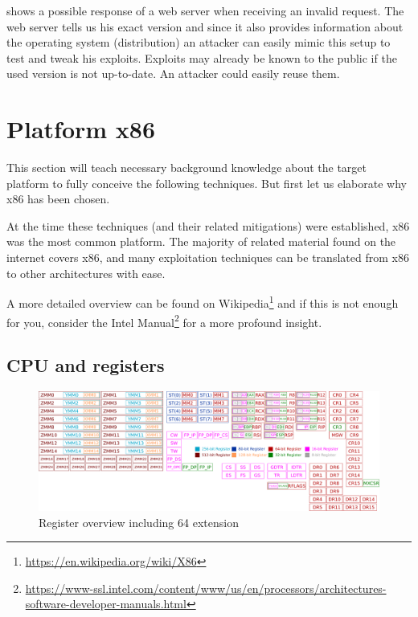\documentclass[article]{uibk}
\begin{document}
 shows a possible response of a web server when
receiving an invalid request. The web server tells us his exact version and
since it also provides information about the operating system (distribution) an
attacker can easily mimic this setup to test and tweak his exploits. Exploits
may already be known to the public if the used version is not up-to-date. An
attacker could easily reuse them.

\section{Platform x86}

This section will teach necessary background knowledge about the target
platform to fully conceive the following techniques. But first let us elaborate
why x86 has been chosen.

At the time these techniques (and their related mitigations) were established,
x86 was the most common platform. The majority of related material found on the
internet covers x86, and many exploitation techniques can be translated from
x86 to other architectures with ease.

A more detailed overview can be found on
Wikipedia\footnote{\url{https://en.wikipedia.org/wiki/X86}} and if this is not
enough for you, consider the Intel
Manual\footnote{\url{https://www-ssl.intel.com/content/www/us/en/processors/architectures-software-developer-manuals.html}}
for a more profound insight.

\subsection{CPU and registers}

\begin{figure}[htpb]
    \centering
    \includegraphics[width=\textwidth]{gfx/x86_registers.pdf}
    \caption{Register overview including \SI{64}{\bit} extension}
    \label{fig:registers}
\end{figure}
\end{document}
